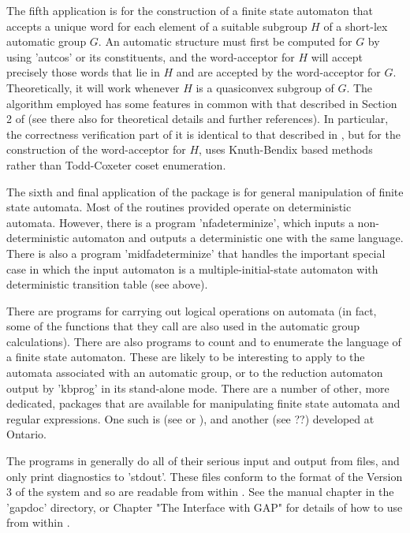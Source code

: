 The fifth application is for the construction of a finite state automaton
that accepts a unique word for each element of a suitable subgroup $H$ of
a short-lex automatic group $G$. An automatic structure must first be computed
for $G$ by using 'autcos' or its constituents, and the word-acceptor for $H$
will accept precisely those words that lie in $H$ and are accepted by the
word-acceptor for $G$. Theoretically, it will work whenever $H$ is a
quasiconvex subgroup of $G$. The algorithm employed has some features in
common with that described in Section 2 of \cite{Kar94} (see there also for
theoretical details and further references). In particular, the
correctness verification part of it is identical to that described in
\cite{Kar94}, but for the construction of the word-acceptor for $H$,
{\KBMAG} uses Knuth-Bendix based methods rather than Todd-Coxeter coset
enumeration.

The sixth and final application of the package is for general manipulation of
finite state automata. Most of the routines provided operate on
deterministic automata. However, there is a program 'nfadeterminize',
which inputs a non-deterministic automaton and outputs a deterministic
one with the same language. 
There is also a program 'midfadeterminize' that handles the
important special case in which the input automaton is
a multiple-initial-state automaton with deterministic transition table
(see above).

There are programs for carrying out logical operations
on automata (in fact, some of the functions that they call are also used
in the automatic group calculations).  There are also programs to count
and to enumerate the language of a finite state automaton. These are
likely to be interesting to apply to the automata associated with
an automatic group, or to the reduction automaton output by 'kbprog' in
its stand-alone mode. There are a number of other, more dedicated,
packages that are available for manipulating finite state automata and
regular expressions. One such is {\Automate} (see \cite{Rie87} or
\cite{ChH91}), and another {\Grail} (see ??) developed at Ontario.

The programs in {\KBMAG} generally do all of their serious input and output
from files, and only print diagnostics to 'stdout'. These files conform to
the format of the Version 3 of the {\GAP} system \cite{Sch92} and so are
readable from within {\GAP}. See the {\GAP} manual chapter in the 'gapdoc'
directory, or Chapter "The Interface with GAP" for details of how to use
{\KBMAG} from within {\GAP}.

